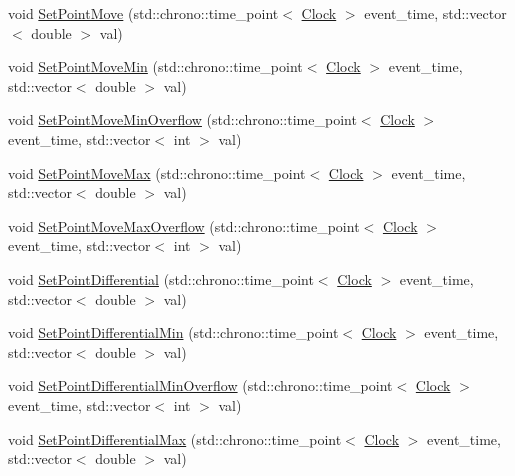 \begin{DoxyCompactItemize}
\item 
void \mbox{\hyperlink{classPoint_a2cf44d5cf17ecf2b3385bde963678589}{Set\+Point\+Move}} (std\+::chrono\+::time\+\_\+point$<$ \mbox{\hyperlink{universe_8h_a0ef8d951d1ca5ab3cfaf7ab4c7a6fd80}{Clock}} $>$ event\+\_\+time, std\+::vector$<$ double $>$ val)
\item 
void \mbox{\hyperlink{classPoint_a287698b6f3ec6a610447fded5c3542ca}{Set\+Point\+Move\+Min}} (std\+::chrono\+::time\+\_\+point$<$ \mbox{\hyperlink{universe_8h_a0ef8d951d1ca5ab3cfaf7ab4c7a6fd80}{Clock}} $>$ event\+\_\+time, std\+::vector$<$ double $>$ val)
\item 
void \mbox{\hyperlink{classPoint_a4a988ff988a3984545cf0c35e764c404}{Set\+Point\+Move\+Min\+Overflow}} (std\+::chrono\+::time\+\_\+point$<$ \mbox{\hyperlink{universe_8h_a0ef8d951d1ca5ab3cfaf7ab4c7a6fd80}{Clock}} $>$ event\+\_\+time, std\+::vector$<$ int $>$ val)
\item 
void \mbox{\hyperlink{classPoint_afa3c2290a72c99e8892029eaa6676204}{Set\+Point\+Move\+Max}} (std\+::chrono\+::time\+\_\+point$<$ \mbox{\hyperlink{universe_8h_a0ef8d951d1ca5ab3cfaf7ab4c7a6fd80}{Clock}} $>$ event\+\_\+time, std\+::vector$<$ double $>$ val)
\item 
void \mbox{\hyperlink{classPoint_a7c9776ffca2fde856fa8eaee669d9881}{Set\+Point\+Move\+Max\+Overflow}} (std\+::chrono\+::time\+\_\+point$<$ \mbox{\hyperlink{universe_8h_a0ef8d951d1ca5ab3cfaf7ab4c7a6fd80}{Clock}} $>$ event\+\_\+time, std\+::vector$<$ int $>$ val)
\item 
void \mbox{\hyperlink{classPoint_adb977a2f01e7a2b549e1bd36fa6f5354}{Set\+Point\+Differential}} (std\+::chrono\+::time\+\_\+point$<$ \mbox{\hyperlink{universe_8h_a0ef8d951d1ca5ab3cfaf7ab4c7a6fd80}{Clock}} $>$ event\+\_\+time, std\+::vector$<$ double $>$ val)
\item 
void \mbox{\hyperlink{classPoint_a944fcec52017ce88e052a576ef143926}{Set\+Point\+Differential\+Min}} (std\+::chrono\+::time\+\_\+point$<$ \mbox{\hyperlink{universe_8h_a0ef8d951d1ca5ab3cfaf7ab4c7a6fd80}{Clock}} $>$ event\+\_\+time, std\+::vector$<$ double $>$ val)
\item 
void \mbox{\hyperlink{classPoint_a582e63ebdbb0979234acb460e673a393}{Set\+Point\+Differential\+Min\+Overflow}} (std\+::chrono\+::time\+\_\+point$<$ \mbox{\hyperlink{universe_8h_a0ef8d951d1ca5ab3cfaf7ab4c7a6fd80}{Clock}} $>$ event\+\_\+time, std\+::vector$<$ int $>$ val)
\item 
void \mbox{\hyperlink{classPoint_ac2e53da4cbee0dc39c0b7a4d3e3a6ee5}{Set\+Point\+Differential\+Max}} (std\+::chrono\+::time\+\_\+point$<$ \mbox{\hyperlink{universe_8h_a0ef8d951d1ca5ab3cfaf7ab4c7a6fd80}{Clock}} $>$ event\+\_\+time, std\+::vector$<$ double $>$ val)

\end{DoxyCompactItemize}
